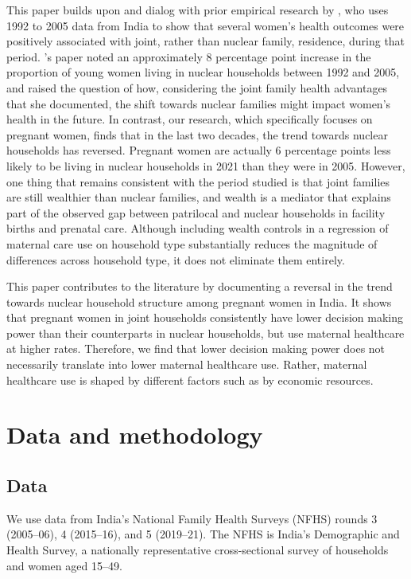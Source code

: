 \documentclass[12pt]{article}
\begin{document}
This paper builds upon and dialog with prior empirical research by \cite{allendorf2013going}, who uses 1992 to 2005 data from India to show that several women's health outcomes were positively associated with joint, rather than nuclear family, residence, during that period.  \cite{allendorf2013going}'s paper noted an approximately 8 percentage point increase in the proportion of young women living in nuclear households between 1992 and 2005, and raised the question of how, considering the joint family health advantages that she documented, the shift towards nuclear families might impact women's health in the future.  In contrast, our research, which specifically focuses on pregnant women, finds that in the last two decades, the trend towards nuclear households has reversed.  Pregnant women are actually 6 percentage points less likely to be living in nuclear households in 2021 than they were in 2005. However, one thing that remains consistent with the period \cite{allendorf2013going} studied is that joint families are still wealthier than nuclear families, and wealth is a mediator that explains part of the observed gap between patrilocal and nuclear households in facility births and prenatal care. Although including wealth controls in a regression of maternal care use on household type substantially reduces the magnitude of differences across household type, it does not eliminate them entirely.

This paper contributes to the literature by documenting a reversal in the trend towards nuclear household structure among pregnant women in India. It shows that pregnant women in joint households consistently have lower decision making power than their counterparts in nuclear households, but use maternal healthcare at higher rates. Therefore, we find that lower decision making power does not necessarily translate into lower maternal healthcare use.  Rather, maternal healthcare use is shaped by different factors such as by economic resources. 

\section{Data and methodology}
\subsection{Data}

We use data from India’s National Family Health Surveys (NFHS) rounds 3 (2005–06), 4 (2015–16), and 5 (2019–21). The NFHS is India’s Demographic and Health Survey, a nationally representative cross-sectional survey of households and women aged 15–49.
\end{document}

